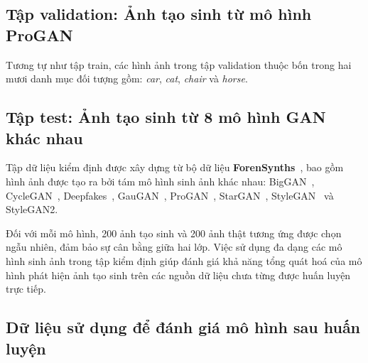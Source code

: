\subsection{Tập \gls{validation}:  Ảnh tạo sinh từ mô hình ProGAN}
Tương tự như tập \gls{train}, các hình ảnh trong tập \gls{validation} thuộc bốn trong hai mươi danh mục đối tượng gồm: \textit{car}, \textit{cat}, \textit{chair} và \textit{horse}.
%


\subsection{Tập \gls{test}: Ảnh tạo sinh từ 8 mô hình GAN khác nhau}
%
\label{ssec:tap_kiem_dinh}
%
Tập dữ liệu kiểm định được xây dựng từ bộ dữ liệu \textbf{ForenSynths}~\cite{Wang2019CNNGeneratedIA}, bao gồm hình ảnh được tạo ra bởi tám mô hình sinh ảnh khác nhau: BigGAN~\cite{brock2018large}, CycleGAN~\cite{zhu2017unpaired}, Deepfakes~\cite{CaliforniaDeepfakes}, GauGAN~\cite{park2019SPADE}, ProGAN~\cite{karras2018progressive}, StarGAN~\cite{choi2018stargan}, StyleGAN~\cite{karras2019style} và StyleGAN2\cite{Karras2019AnalyzingAI}.  

Đối với mỗi mô hình, 200 ảnh tạo sinh và 200 ảnh thật tương ứng được chọn ngẫu nhiên, đảm bảo sự cân bằng giữa hai lớp. Việc sử dụng đa dạng các mô hình sinh ảnh trong tập kiểm định giúp đánh giá khả năng tổng quát hoá của mô hình phát hiện ảnh tạo sinh trên các nguồn dữ liệu chưa từng được huấn luyện trực tiếp.

\subsection{Dữ liệu sử dụng để đánh giá mô hình sau huấn luyện}

